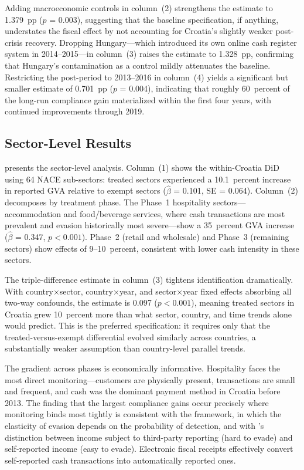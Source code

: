 \documentclass[12pt]{article}
\begin{document}
Adding macroeconomic controls in column~(2) strengthens the estimate to 1.379~pp ($p$ = 0.003), suggesting that the baseline specification, if anything, understates the fiscal effect by not accounting for Croatia's slightly weaker post-crisis recovery. Dropping Hungary---which introduced its own online cash register system in 2014--2015---in column~(3) raises the estimate to 1.328~pp, confirming that Hungary's contamination as a control mildly attenuates the baseline. Restricting the post-period to 2013--2016 in column~(4) yields a significant but smaller estimate of 0.701~pp ($p$ = 0.004), indicating that roughly 60~percent of the long-run compliance gain materialized within the first four years, with continued improvements through 2019.

\subsection{Sector-Level Results}



 presents the sector-level analysis. Column~(1) shows the within-Croatia DiD using 64 NACE sub-sectors: treated sectors experienced a 10.1~percent increase in reported GVA relative to exempt sectors ($\hat{\beta}$ = 0.101, SE = 0.064). Column~(2) decomposes by treatment phase. The Phase~1 hospitality sectors---accommodation and food/beverage services, where cash transactions are most prevalent and evasion historically most severe---show a 35~percent GVA increase ($\hat{\beta}$ = 0.347, $p < 0.001$). Phase~2 (retail and wholesale) and Phase~3 (remaining sectors) show effects of 9--10~percent, consistent with lower cash intensity in these sectors.

The triple-difference estimate in column~(3) tightens identification dramatically. With country$\times$sector, country$\times$year, and sector$\times$year fixed effects absorbing all two-way confounds, the estimate is 0.097 ($p < 0.001$), meaning treated sectors in Croatia grew 10~percent more than what sector, country, and time trends alone would predict. This is the preferred specification: it requires only that the treated-versus-exempt differential evolved similarly across countries, a substantially weaker assumption than country-level parallel trends.

The gradient across phases is economically informative. Hospitality faces the most direct monitoring---customers are physically present, transactions are small and frequent, and cash was the dominant payment method in Croatia before 2013. The finding that the largest compliance gains occur precisely where monitoring binds most tightly is consistent with the \citet{allingham1972} framework, in which the elasticity of evasion depends on the probability of detection, and with \citet{kleven2011}'s distinction between income subject to third-party reporting (hard to evade) and self-reported income (easy to evade). Electronic fiscal receipts effectively convert self-reported cash transactions into automatically reported ones.
\end{document}

